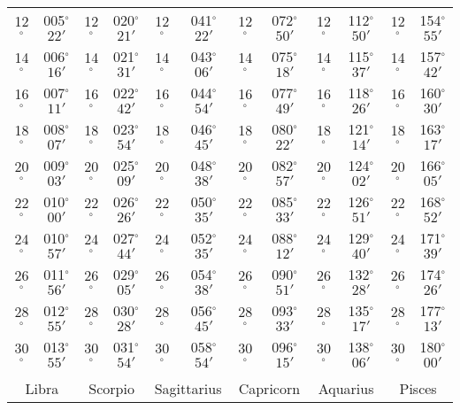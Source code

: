\begin{table}
{\begin{tabular}{cc|cc|cc|cc|cc|cc}
12$^\circ$ & 005$^\circ$$22'$ & 12$^\circ$ & 020$^\circ$$21'$ & 12$^\circ$ & 041$^\circ$$22'$ & 12$^\circ$ & 072$^\circ$$50'$ & 12$^\circ$ & 112$^\circ$$50'$ & 12$^\circ$ & 154$^\circ$$55'$\\
14$^\circ$ & 006$^\circ$$16'$ & 14$^\circ$ & 021$^\circ$$31'$ & 14$^\circ$ & 043$^\circ$$06'$ & 14$^\circ$ & 075$^\circ$$18'$ & 14$^\circ$ & 115$^\circ$$37'$ & 14$^\circ$ & 157$^\circ$$42'$\\
16$^\circ$ & 007$^\circ$$11'$ & 16$^\circ$ & 022$^\circ$$42'$ & 16$^\circ$ & 044$^\circ$$54'$ & 16$^\circ$ & 077$^\circ$$49'$ & 16$^\circ$ & 118$^\circ$$26'$ & 16$^\circ$ & 160$^\circ$$30'$\\
18$^\circ$ & 008$^\circ$$07'$ & 18$^\circ$ & 023$^\circ$$54'$ & 18$^\circ$ & 046$^\circ$$45'$ & 18$^\circ$ & 080$^\circ$$22'$ & 18$^\circ$ & 121$^\circ$$14'$ & 18$^\circ$ & 163$^\circ$$17'$\\
20$^\circ$ & 009$^\circ$$03'$ & 20$^\circ$ & 025$^\circ$$09'$ & 20$^\circ$ & 048$^\circ$$38'$ & 20$^\circ$ & 082$^\circ$$57'$ & 20$^\circ$ & 124$^\circ$$02'$ & 20$^\circ$ & 166$^\circ$$05'$\\
22$^\circ$ & 010$^\circ$$00'$ & 22$^\circ$ & 026$^\circ$$26'$ & 22$^\circ$ & 050$^\circ$$35'$ & 22$^\circ$ & 085$^\circ$$33'$ & 22$^\circ$ & 126$^\circ$$51'$ & 22$^\circ$ & 168$^\circ$$52'$\\
24$^\circ$ & 010$^\circ$$57'$ & 24$^\circ$ & 027$^\circ$$44'$ & 24$^\circ$ & 052$^\circ$$35'$ & 24$^\circ$ & 088$^\circ$$12'$ & 24$^\circ$ & 129$^\circ$$40'$ & 24$^\circ$ & 171$^\circ$$39'$\\
26$^\circ$ & 011$^\circ$$56'$ & 26$^\circ$ & 029$^\circ$$05'$ & 26$^\circ$ & 054$^\circ$$38'$ & 26$^\circ$ & 090$^\circ$$51'$ & 26$^\circ$ & 132$^\circ$$28'$ & 26$^\circ$ & 174$^\circ$$26'$\\
28$^\circ$ & 012$^\circ$$55'$ & 28$^\circ$ & 030$^\circ$$28'$ & 28$^\circ$ & 056$^\circ$$45'$ & 28$^\circ$ & 093$^\circ$$33'$ & 28$^\circ$ & 135$^\circ$$17'$ & 28$^\circ$ & 177$^\circ$$13'$\\
30$^\circ$ & 013$^\circ$$55'$ & 30$^\circ$ & 031$^\circ$$54'$ & 30$^\circ$ & 058$^\circ$$54'$ & 30$^\circ$ & 096$^\circ$$15'$ & 30$^\circ$ & 138$^\circ$$06'$ & 30$^\circ$ & 180$^\circ$$00'$\\
\multicolumn{12}{c}{}\\
\multicolumn{2}{c}{Libra}\vline & \multicolumn{2}{c}{Scorpio} \vline& \multicolumn{2}{c}{Sagittarius} \vline& \multicolumn{2}{c}{Capricorn}\vline &
\multicolumn{2}{c}{Aquarius}\vline & \multicolumn{2}{c}{Pisces}\\\hline

\end{tabular}}
\end{table}
